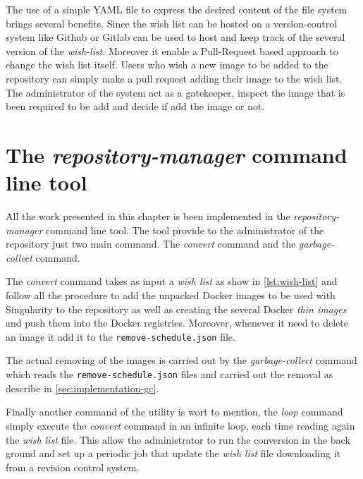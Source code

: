 The use of a simple YAML file to express the desired content of the file system
brings several benefits.  Since the wish list can be hosted on a
version-control system like Github or Gitlab can be used to host and keep track
of the several version of the \textit{wish-list}. Moreover it enable a
Pull-Request based approach to change the wish list itself. Users who wish a
new image to be added to the repository can simply make a pull request adding
their image to the wish list. The administrator of the system act as a
gatekeeper, inspect the image that is been required to be add and decide if add
the image or not.

\section{The \textit{repository-manager} command line tool}

All the work presented in this chapter is been implemented in the
\textit{repository-manager} \cite{repository-manager} command line tool. The
tool provide to the administrator of the repository just two main command. The
\textit{convert} command and the \textit{garbage-collect} command.

The \textit{convert} command takes as input a \textit{wish list} as show in
\ref{lst:wish-list} and follow all the procedure to add the unpacked Docker
images to be used with Singularity to the repository as well as creating the
several Docker \textit{thin images} and push them into the Docker registries.
Moreover, whenever it need to delete an image it add it to the
\texttt{remove-schedule.json} file. 

The actual removing of the images is carried out by the
\textit{garbage-collect} command which reads the \texttt{remove-schedule.json}
files and carried out the removal as describe in \ref{sec:implementation-gc}.

Finally another command of the utility is wort to mention, the \textit{loop}
command simply execute the \textit{convert} command in an infinite loop, each
time reading again the \textit{wish list} file. This allow the administrator to
run the conversion in the back ground and set up a periodic job that update the
\textit{wish list} file downloading it from a revision control system.


